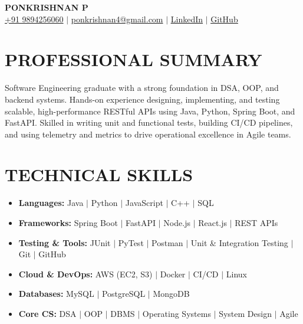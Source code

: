 \documentclass[a4paper,10pt]{article}
\begin{document}
\begin{center}

{\fontsize{20}{22}\selectfont\textbf{PONKRISHNAN P}}\\[3pt]

{\fontsize{9.8}{11}\selectfont
\href{tel:+919894256060}{+91 9894256060}
\;$|$\;
\href{mailto:ponkrishnan4@gmail.com}{ponkrishnan4@gmail.com}
\;$|$\;
\href{https://www.linkedin.com/in/ponkrishnan-p-1316ab259/}{\underline{LinkedIn}}
\;$|$\;
\href{https://github.com/Ponkrishnan}{\underline{GitHub}}
}

\end{center}

\vspace{-3pt}

\section*{PROFESSIONAL SUMMARY}

{\fontsize{10}{12.5}\selectfont
Software Engineering graduate with a strong foundation in DSA, OOP, and backend systems. Hands-on experience designing, implementing, and testing scalable, high-performance RESTful APIs using Java, Python, Spring Boot, and FastAPI. Skilled in writing unit and functional tests, building CI/CD pipelines, and using telemetry and metrics to drive operational excellence in Agile teams.
}

\section*{TECHNICAL SKILLS}

\begin{itemize}[leftmargin=0.16in,itemsep=1.5pt,topsep=2pt]

\item \textbf{Languages:} Java $\mid$ Python $\mid$ JavaScript $\mid$ C++ $\mid$ SQL

\item \textbf{Frameworks:} Spring Boot $\mid$ FastAPI $\mid$ Node.js $\mid$ React.js $\mid$ REST APIs

\item \textbf{Testing \& Tools:} JUnit $\mid$ PyTest $\mid$ Postman $\mid$ Unit \& Integration Testing $\mid$ Git $\mid$ GitHub

\item \textbf{Cloud \& DevOps:} AWS (EC2, S3) $\mid$ Docker $\mid$ CI/CD $\mid$ Linux

\item \textbf{Databases:} MySQL $\mid$ PostgreSQL $\mid$ MongoDB

\item \textbf{Core CS:} DSA $\mid$ OOP $\mid$ DBMS $\mid$ Operating Systems $\mid$ System Design $\mid$ Agile

\end{itemize}
\end{document}
